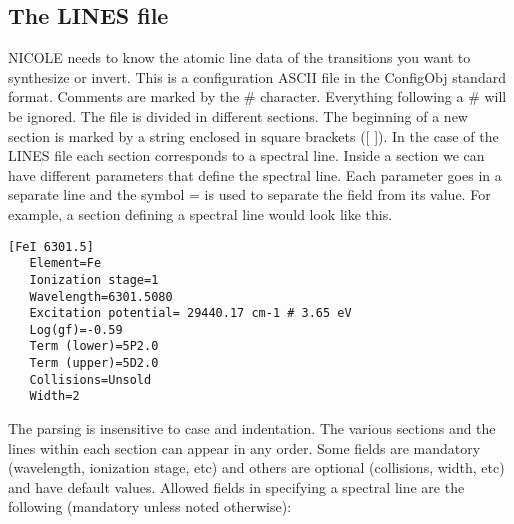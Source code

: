 \subsection{The LINES file}
NICOLE needs to know the atomic line data of the transitions you want
to synthesize or invert. This is a configuration ASCII file in the ConfigObj standard
format. Comments are marked by the \# character. Everything following
a \# will be ignored. The file is divided in different sections. The
beginning of a new section is marked by a string enclosed in square
brackets ([ ]). In the case of the LINES file each section corresponds
to a spectral line. Inside a section we can have different parameters
that define the spectral line. Each parameter goes in a separate line
and the symbol = is used to separate the field from its value. For
example, a section defining a spectral line would look like this.

\begin{verbatim}
[FeI 6301.5]
   Element=Fe
   Ionization stage=1
   Wavelength=6301.5080
   Excitation potential= 29440.17 cm-1 # 3.65 eV
   Log(gf)=-0.59
   Term (lower)=5P2.0
   Term (upper)=5D2.0
   Collisions=Unsold
   Width=2
\end{verbatim}

The parsing is insensitive to case and indentation. The various
sections and the lines within each section can appear in any
order. Some fields are mandatory (wavelength, ionization stage, etc)
and others are optional (collisions, width, etc) and have default
values. Allowed fields in specifying a spectral line are the
following (mandatory unless noted otherwise):

